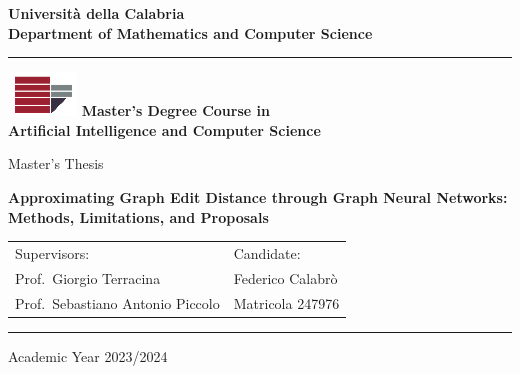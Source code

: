 \documentclass[a4paper,12pt]{report}
\begin{document}
\begin{titlepage}
\begin{center}
\textbf{\LARGE Università della Calabria}\\
\textbf{Department of Mathematics and Computer Science}\\
\vskip 6pt
\hrule
\vskip 8pt
\includegraphics{Images/unical-logo.png}
\vskip 8pt
\textbf{Master's Degree Course in \\ Artificial Intelligence and Computer Science}

\vskip 32pt
Master's Thesis

\vskip 32pt
{ \huge \bfseries Approximating Graph Edit Distance through Graph Neural Networks: Methods, Limitations, and Proposals}\\[0.4cm]
\vskip 100pt

\begin{tabular}{p{8cm}p{8cm}}
Supervisors: & Candidate:\\
Prof.~Giorgio Terracina & Federico Calabrò \\
Prof.~Sebastiano Antonio Piccolo & Matricola 247976\\
\end{tabular}

\vskip 100pt
\hrule
\vskip 6pt
Academic Year 2023/2024
\vfill
\end{center}

\end{titlepage}
\end{document}
